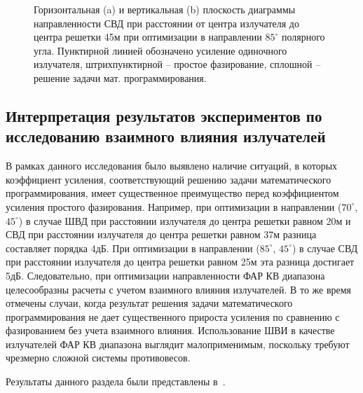\begin{figure}
\begin{minipage}[h]{0.49\linewidth}
\end{minipage}
\hfill
\begin{minipage}[h]{0.49\linewidth}
\end{minipage}
\caption{Горизонтальная (a) и вертикальная (b) плоскость диаграммы направленности СВД при расстоянии от центра излучателя до центра решетки 45м при оптимизации в направлении $85^{\circ}$ полярного угла. Пунктирной линией обозначено усиление одиночного излучателя, штрихпунктирной -- простое фазирование, сплошной -- решение задачи мат. программирования.}
\label{ris:svd_mut_5_85_45}
\end{figure}

\subsection{Интерпретация результатов экспериментов по исследованию взаимного влияния излучателей}
В рамках данного исследования было выявлено наличие ситуаций, в которых коэффициент усиления, соответствующий решению задачи математического программирования, имеет существенное преимущество перед коэффициентом усиления простого фазирования. Например, при оптимизации в направлении ($70^{\circ}$, $45^\circ$) в случае ШВД при расстоянии излучателя до центра решетки равном 20м и СВД при расстоянии излучателя до центра решетки равном 37м разница составляет порядка 4дБ. При оптимизации в направлении ($85^\circ$, $45^{\circ}$) в случае СВД  при расстоянии излучателя до центра решетки равном 25м эта разница достигает 5дБ. Следовательно, при оптимизации направленности ФАР КВ диапазона целесообразны расчеты с учетом взаимного влияния излучателей. В то же время отмечены случаи, когда результат решения задачи математического программирования не дает существенного прироста усиления по сравнению с фазированием без учета взаимного влияния.
Использование ШВИ в качестве излучателей ФАР КВ диапазона выглядит малоприменимым, поскольку требуют чрезмерно сложной системы противовесов.

Результаты данного раздела были представлены в~\cite{tyu:jphys}.
